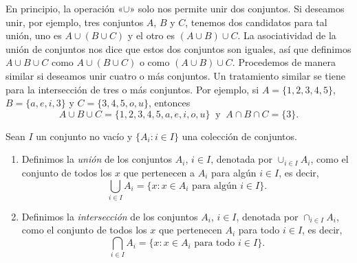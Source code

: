 \documentclass[12pt,a4paper]{book}
\begin{document}
    \begin{observacion}\label{obs:1}
        En principio, la operación «$\cup$» solo nos permite unir dos
        conjuntos. Si deseamos unir, por ejemplo, tres conjuntos $A$, $B$ y $C$, tenemos
        dos candidatos para tal unión, uno es $A\cup(B\cup C)$ y el otro es $(A\cup B)\cup C$. La
        asociatividad de la unión de conjuntos nos dice que estos dos conjuntos son
        iguales, así que definimos $A\cup B\cup C$ como $A\cup(B\cup C)$ o como $(A\cup B)\cup C$.
        Procedemos de manera similar si deseamos unir cuatro o más conjuntos. Un
        tratamiento similar se tiene para la intersección de tres o más conjuntos. Por
        ejemplo, si $A=\{1,2,3,4,5\}$, $B=\{a,e,i,3\}$ y $C=\{3,4,5,o,u\}$, entonces
        \begin{equation*}
            A\cup B\cup C=\{1,2,3,4,5,a,e,i,o,u\}\ \text{ y }\ A\cap B\cap C=\{3\}.
        \end{equation*}
    \end{observacion}

    \begin{definicion}\label{def:5}
        Sean $I$ un conjunto
        no vacío y $\{A_{i}:i\in I\}$ una colección de conjuntos.
        \begin{enumerate}
            \item Definimos la \textit{unión} de los conjuntos $A_{i}$, $i\in I$, denotada por $\cup_{i\in I}A_{i}$, como
            el conjunto de todos los $x$ que pertenecen a $A_{i}$ para algún $i\in I$, es decir,
            \begin{equation*}
                \bigcup_{i\in I}A_{i}=\{x:x\in A_{i}\text{ para algún }i\in I\}.
            \end{equation*}
            \item Definimos la \textit{intersección} de los conjuntos $A_{i}$, $i\in I$, denotada por $\cap_{i\in I}A_{i}$,
            como el conjunto de todos los $x$ que pertenecen $A_{i}$ para todo $i\in I$, es
            decir,
            \begin{equation*}
                \bigcap_{i\in I}A_{i}=\{x:x\in A_{i}\text{ para todo }i\in I\}.
            \end{equation*}
        \end{enumerate}
    \end{definicion}
\end{document}
